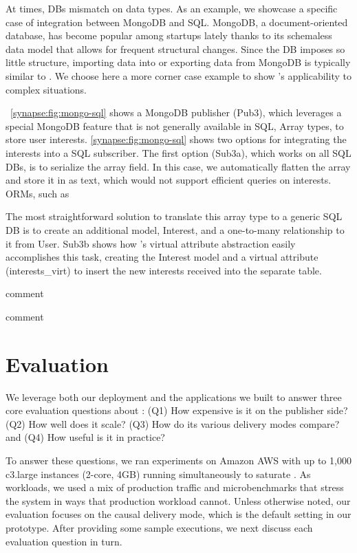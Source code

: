 At times, DBs mismatch on data types.  As an example, we showcase a specific
case of integration between MongoDB and SQL.
MongoDB, a document-oriented database, has become popular among startups
lately thanks to its schemaless data model that allows for frequent
structural changes.  Since the DB imposes so little structure, importing data
into or exporting data from MongoDB is typically similar to
\label{synapse:fig:mongo-to-star}. We choose here a more corner case example to
show \synapse's applicability to complex situations.

\F~\ref{synapse:fig:mongo-sql} shows a MongoDB publisher (Pub3), which leverages a
special MongoDB feature that is not generally available in SQL,
Array types, to store user interests.  \F\ref{synapse:fig:mongo-sql} shows two options
for integrating the interests into a SQL subscriber.  The first option (Sub3a),
which works on all SQL DBs, is to serialize the array field.
In this case, we automatically flatten the array and store it in as text, which would not support efficient queries on interests.  ORMs, such as

The most straightforward solution to translate this array type to a generic SQL DB is to create an additional model, {\code \footnotesize Interest}, and a one-to-many relationship to it from {\code \footnotesize User}.
Sub3b shows how \synapse's virtual attribute abstraction easily accomplishes
this task, creating the {\code \footnotesize Interest} model and a virtual
attribute  ({\code \footnotesize interests\_virt}) to insert the new interests
received into the separate table.

   comment

   comment

\section{Evaluation}
\label{synapse:sec:evaluation}

We leverage both our deployment and the applications we built to answer three
core evaluation questions about \synapse: (Q1) How expensive is it
on the publisher side? (Q2) How well does it scale? (Q3) How do its various
delivery modes compare? and (Q4) How useful is it in practice?

To answer these questions, we ran experiments on Amazon AWS with up to 1,000
c3.large instances (2-core, 4GB) running simultaneously to saturate \synapse.
As workloads, we used a mix of \crowdtap production traffic and microbenchmarks
that stress the system in ways that production workload cannot.  Unless
otherwise noted, our evaluation focuses on the causal delivery mode, which is
the default setting in our prototype.  After providing some sample executions,
we next discuss each evaluation question in turn.

